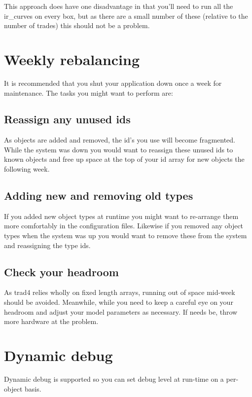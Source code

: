 \documentclass{report}
\begin{document}
This approach does have one disadvantage in that you'll need to run all the ir_curves on every box, but as there are a small number of these (relative to the number of trades) this should not be a problem.

\section{Weekly rebalancing}

It is recommended that you shut your application down once a week for maintenance. The tasks you might want to perform are:

\subsection{Reassign any unused ids}

As objects are added and removed, the id's you use will become fragmented. While the system was down you would want to reassign these unused ids to known objects and free up space at the top of your id array for new objects the following week.

\subsection{Adding new and removing old types}

If you added new object types at runtime you might want to re-arrange them more comfortably in the configuration files. Likewise if you removed any object types when the system was up you would want to remove these from the system and reassigning the type ids.

\subsection{Check your headroom}

As trad4 relies wholly on fixed length arrays, running out of space mid-week should be avoided.  Meanwhile, while you need to keep a careful eye on your headroom and adjust your model parameters as necessary. If needs be, throw more hardware at the problem.

\section{Dynamic debug}

Dynamic debug is supported so you can set debug level at run-time on a per-object basis. 
\end{document}
